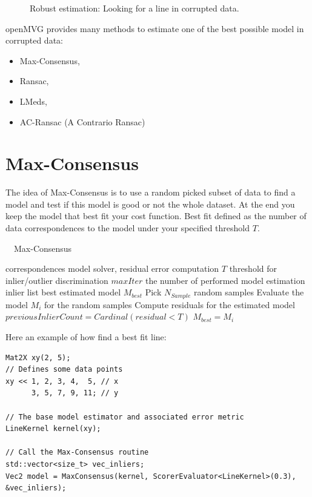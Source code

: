 \documentclass[11pt, letterpaper]{report}
\begin{document}
\begin{figure}[h!]
\begin{center}
\caption{Robust estimation: Looking for a line in corrupted data.}
\end{center}
\end{figure}


openMVG provides many methods to estimate one of the best possible model in corrupted data:
\begin{itemize}
\item Max-Consensus,
\item Ransac,
\item LMeds,
\item AC-Ransac (A Contrario Ransac)
\end{itemize}

\newpage
\section{Max-Consensus}
The idea of Max-Consensus is to use a random picked subset of data to find a model and test if this model is good or not the whole dataset. At the end you keep the model that best fit your cost function. Best fit defined as the number of data correspondences to the model under your specified threshold $T$.

\begin{algorithm}
\caption{~~Max-Consensus}
\begin{algorithmic}\label{algo:Max-Consensus}
\REQUIRE correspondences
\REQUIRE model solver, residual error computation
\REQUIRE $T$ threshold for inlier/outlier discrimination
\REQUIRE $maxIter$ the number of performed model estimation
\ENSURE inlier list
\ENSURE best estimated model $M_{best}$
\STATE Pick $N_{Sample}$ random samples
\STATE Evaluate the model $M_i$ for the random samples
\STATE Compute residuals for the estimated model
\STATE $previousInlierCount = Cardinal(residual<T)$
\STATE $M_{best} = M_i$
\ENDIF
\ENDFOR
\end{algorithmic}
\end{algorithm}

Here an example of how find a best fit line:
\vspace{-.5cm}
\begin{lstlisting}
Mat2X xy(2, 5);
// Defines some data points
xy << 1, 2, 3, 4,  5, // x 
      3, 5, 7, 9, 11; // y

// The base model estimator and associated error metric
LineKernel kernel(xy);

// Call the Max-Consensus routine
std::vector<size_t> vec_inliers;
Vec2 model = MaxConsensus(kernel, ScorerEvaluator<LineKernel>(0.3), &vec_inliers);
\end{lstlisting}
\end{document}
